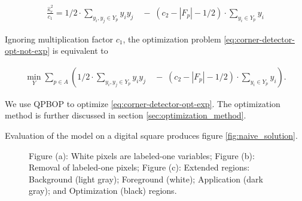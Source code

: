 \documentclass[runningheads]{llncs}
\begin{document}
	\begin{align*}
		\frac{\hat{\kappa}_{r}^2}{c_1} =1/2 \cdot \sum_{ y_i,y_j \in Y_{p} }{y_iy_j} \quad  - \;(c_2-|F_p|-1/2)\cdot \sum_{y_i \in Y_{p}}{y_i}
	\end{align*}

	Ignoring multiplication factor $c_1$, the optimization problem \eqref{eq:corner-detector-opt-not-exp} is equivalent to
	
\begin{align}			
	\min_{Y} \sum_{p \in A}\left( { 1/2 \cdot \sum_{ y_i,y_j \in Y_{p} }{y_iy_j} \quad  - \;(c_2-|F_p|-1/2)\cdot \sum_{y_i \in Y_{p}}{y_i} } \right).
	\label{eq:corner-detector-opt-exp}
\end{align}

We use QPBOP to optimize \eqref{eq:corner-detector-opt-exp}. The optimization method is further discussed in section \ref{sec:optimization_method}.

Evaluation of the model on a digital square produces figure \ref{fig:naive_solution}.


	\begin{figure}[!ht]
		\center
		\hspace{40pt}
		\hspace{40pt}
		\caption{Figure (a): White pixels are labeled-one variables; Figure (b): Removal of labeled-one pixels; Figure (c): Extended regions: Background (light gray); Foreground (white); Application (dark gray); and Optimization (black) regions.}	
					
	\end{figure}
\end{document}
